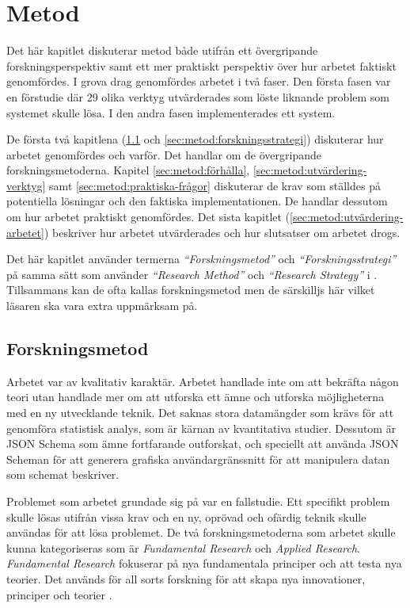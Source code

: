 \chapter{Metod}
\label{sec:metod}

Det här kapitlet diskuterar metod både utifrån ett övergripande forskningsperspektiv samt ett mer praktiskt perspektiv över hur arbetet faktiskt genomfördes. I grova drag genomfördes arbetet i två faser. Den första fasen var en förstudie där 29 olika verktyg utvärderades som löste liknande problem som systemet skulle lösa. I den andra fasen implementerades ett system.

De första två kapitlena (\ref{sec:metod:forskningsmetod} och \ref{sec:metod:forskningsstrategi}) diskuterar hur arbetet genomfördes och varför. Det handlar om de övergripande forskningsmetoderna. Kapitel \ref{sec:metod:förhålla}, \ref{sec:metod:utvärdering-verktyg} samt \ref{sec:metod:praktiska-frågor} diskuterar de krav som ställdes på potentiella lösningar och den faktiska implementationen. De handlar dessutom om hur arbetet praktiskt genomfördes. Det sista kapitlet (\ref{sec:metod:utvärdering-arbetet}) beskriver hur arbetet utvärderades och hur slutsatser om arbetet drogs.

Det här kapitlet använder termerna \textit{``Forskningsmetod''} och \textit{``Forskningsstrategi''} på samma sätt som \citeauthor{Hakansson} använder \textit{``Research Method''} och \textit{``Research Strategy''} i \textit{} \cite{Hakansson}. Tillsammans kan de ofta kallas forskningsmetod men de särskilljs här vilket läsaren ska vara extra uppmärksam på.

\section{Forskningsmetod}
\label{sec:metod:forskningsmetod}
Arbetet var av kvalitativ karaktär. Arbetet handlade inte om att bekräfta någon teori utan handlade mer om att utforska ett ämne och utforska möjligheterna med en ny utvecklande teknik. Det saknas stora datamängder som krävs för att genomföra statistisk analys, som är kärnan av kvantitativa studier. Dessutom är JSON Schema som ämne fortfarande outforskat, och speciellt att använda JSON Scheman för att generera grafiska användargränssnitt för att manipulera datan som schemat beskriver.

Problemet som arbetet grundade sig på var en fallstudie. Ett specifikt problem skulle lösas utifrån vissa krav och en ny, oprövad och ofärdig teknik skulle användas för att lösa problemet. De två forskningsmetoderna som arbetet skulle kunna kategoriseras som är \textit{Fundamental Research} och \textit{Applied Research}. \textit{Fundamental Research} fokuserar på nya fundamentala principer och att testa nya teorier. Det används för all sorts forskning för att skapa nya innovationer, principer och teorier \cite{Hakansson}.

